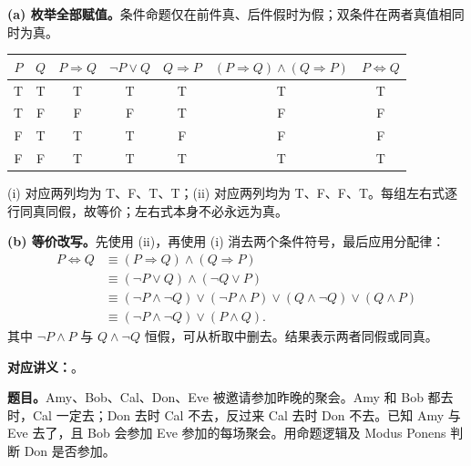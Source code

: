 \begin{checkedsolution}
\textbf{(a) 枚举全部赋值。}条件命题仅在前件真、后件假时为假；双条件在两者真值相同时为真。
\begin{center}
\small
\begin{tabular}{@{}cc|cc|ccc@{}}
\toprule
$P$ & $Q$ & $P\Rightarrow Q$ & $\neg P\lor Q$ & $Q\Rightarrow P$ & $(P\Rightarrow Q)\land(Q\Rightarrow P)$ & $P\Leftrightarrow Q$ \\
\midrule
T & T & T & T & T & T & T \\
T & F & F & F & T & F & F \\
F & T & T & T & F & F & F \\
F & F & T & T & T & T & T \\
\bottomrule
\end{tabular}
\end{center}
(i) 对应两列均为 T、F、T、T；(ii) 对应两列均为 T、F、F、T。每组左右式逐行同真同假，故等价；左右式本身不必永远为真。

\textbf{(b) 等价改写。}先使用 (ii)，再使用 (i) 消去两个条件符号，最后应用分配律：
\begin{align*}
P\Leftrightarrow Q
&\equiv(P\Rightarrow Q)\land(Q\Rightarrow P)\\
&\equiv(\neg P\lor Q)\land(\neg Q\lor P)\\
&\equiv(\neg P\land\neg Q)\lor(\neg P\land P)
       \lor(Q\land\neg Q)\lor(Q\land P)\\
&\equiv(\neg P\land\neg Q)\lor(P\land Q).
\end{align*}
其中 $\neg P\land P$ 与 $Q\land\neg Q$ 恒假，可从析取中删去。结果表示两者同假或同真。
\end{checkedsolution}

\textbf{对应讲义：}。

\textbf{题目。}Amy、Bob、Cal、Don、Eve 被邀请参加昨晚的聚会。Amy 和 Bob 都去时，Cal 一定去；Don 去时 Cal 不去，反过来 Cal 去时 Don 不去。已知 Amy 与 Eve 去了，且 Bob 会参加 Eve 参加的每场聚会。用命题逻辑及 Modus Ponens 判断 Don 是否参加。

